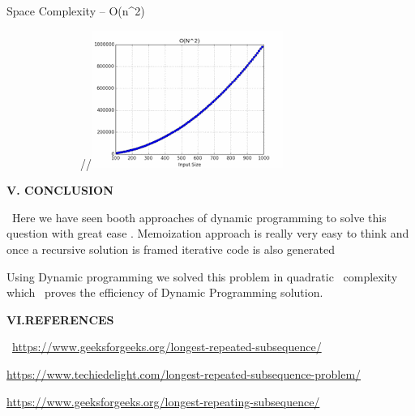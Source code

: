 \documentclass[letterpaper]{article}
\begin{document}
\begin{multicols}{2}
Space Complexity -- O(n\^{}2)

\ \ \ \ \ \ \ \ \ \ \ \ \ //\includegraphics[scale=1]{complexity}

{\bfseries
V. CONCLUSION}

\ Here we have seen booth approaches of dynamic programming to solve this question with great ease . Memoization
approach is really very easy to think and once a recursive solution is framed iterative code is also generated

Using Dynamic programming we solved this problem in quadratic \ complexity which \ proves the efficiency of Dynamic
Programming solution.


\bigskip


\bigskip


\bigskip


\bigskip


\bigskip


\bigskip
\end{multicols}
{\bfseries
VI.REFERENCES}

\bigskip

\ \url{https://www.geeksforgeeks.org/longest-repeated-subsequence/}

\url{https://www.techiedelight.com/longest-repeated-subsequence-problem/}

\url{https://www.geeksforgeeks.org/longest-repeating-subsequence/}

\bigskip


\bigskip


\bigskip


\bigskip
\end{document}
